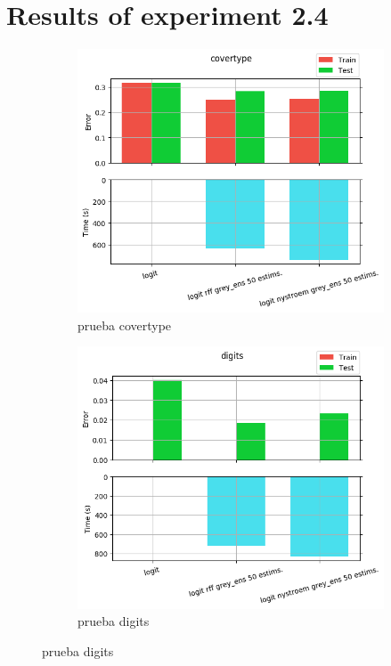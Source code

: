 
\chapter{Results of experiment 2.4} %

\label{Appendix2-4} %

\begin{figure}[ht]
  \centering
  \begin{subfigure}[b]{0.5\linewidth}
    \centering\includegraphics[width=\imgscale\linewidth]{Figures/2_4/covertype}
    \caption{prueba covertype}
    \label{fig:2_4_covertype}
  \end{subfigure}%
  \begin{subfigure}[b]{0.5\linewidth}
    \centering\includegraphics[width=\imgscale\linewidth]{Figures/2_4/digits}
    \caption{prueba digits}
    \label{fig:2_4_digits}
  \end{subfigure}
\end{figure}


